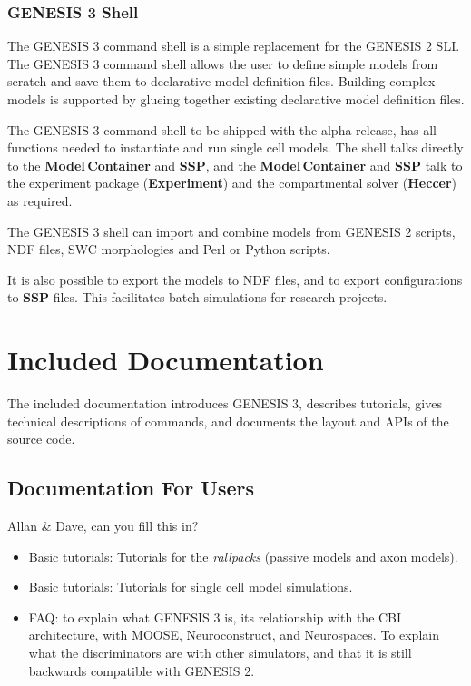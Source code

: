 \documentclass[12pt]{article}
\begin{document}
\subsubsection{GENESIS 3 Shell}

The GENESIS 3 command shell is a simple replacement for the GENESIS 2
SLI.  The GENESIS 3 command shell allows the user to define simple
models from scratch and save them to declarative model definition
files.  Building complex models is supported by glueing together
existing declarative model definition files.

The GENESIS 3 command shell to be shipped with the alpha release, has
all functions needed to instantiate and run single cell models.  The
shell talks directly to the {\bf Model\,Container} and {\bf SSP}, and
the {\bf Model\,Container} and {\bf SSP} talk to the experiment
package ({\bf Experiment}) and the compartmental solver ({\bf Heccer})
as required.

The GENESIS 3 shell can import and combine models from GENESIS 2
scripts, NDF files, SWC morphologies and Perl or Python scripts.

It is also possible to export the models to NDF files, and to export
configurations to {\bf SSP} files.  This facilitates batch simulations for
research projects.


\section{Included Documentation}

The included documentation introduces GENESIS 3, describes tutorials, gives technical
descriptions of commands, and documents the layout and APIs of the
source code.


\subsection{Documentation For Users}

Allan \& Dave, can you fill this in?

\begin{itemize}
\item Basic tutorials: Tutorials for the {\it rallpacks} (passive models and
  axon models).
\item Basic tutorials: Tutorials for single cell model simulations.
\item FAQ: to explain what GENESIS 3 is, its relationship with the CBI
  architecture, with MOOSE, Neuroconstruct, and Neurospaces.  To
  explain what the discriminators are with other simulators, and that
  it is still backwards compatible with GENESIS 2.
\end{itemize}
\end{document}
